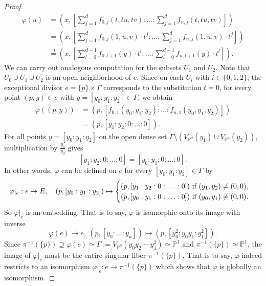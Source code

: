 \documentclass[english,11pt,reqno]{amsart}
\newcommand{\Pone}{\mathbb{P}^1}
\newcommand{\Ptwo}{\mathbb{P}^2}
\newcommand{\Pthree}{\mathbb{P}^3}
\newcommand{\VPtwo}{V_{\Ptwo}}
\newcommand{\VPthree}{V_{\Pthree}}
\begin{document}
\begin{proof}
\begin{align*}
\varphi(u) &= \left(x,\left[\sum_{j=1}^d f_{0,j}(t,tu,tv): {\dots}: \sum_{j=1}^d f_{n,j}(t,tu,tv) \right]\right) \\
&= \left(x,\left[\sum_{j=1}^d f_{0,j}(1,u,v)\cdot t^j: {\dots}: \sum_{j=1}^d f_{n,j}(1,u,v) \cdot t^j \right]\right) \\
&\overset{:t}{=} \left(x,\left[\sum_{l=0}^{d-1} f_{0,l+1}(y)\cdot t^l: {\dots}: \sum_{l=0}^{d-1} f_{n,l+1}(y) \cdot t^l \right]\right).
\end{align*}
We can carry out analogous computation for the subsets $U_1$ and $U_2$. Note that $U_0\cup U_1\cup U_2$ is an open neighborhood of $e$. Since on each $U_i$ with $i\in\{0,1,2\}$, the exceptional divisor $e=\{p\}\times \Gamma$ corresponds to the substitution $t=0$, for every point $(p,y)\in e$ with $y=[y_0:y_1:y_2]\in\Gamma$, we obtain
\begin{align*}
\varphi((p,y)) &= (p,[f_{0,1}(y_0,y_1,y_2):{\dots} :f_{n,1}(y_0,y_1,y_2)]) \\
&= (p,[y_1:y_2:0:{\dots}:0 ]).
\end{align*}
For all points $y=[y_0:y_1:y_2]$ on the open dense set $\Gamma \setminus (\VPtwo(y_1)\cup \VPtwo(y_2))$, multiplication by $\frac{y_1}{y_2}$ gives $$[y_1:y_2:0:{\dots}:0] = [y_0:y_1:0:{\dots}:0].$$
In other words, $\varphi$ can be defined on $e$ for every $[y_0:y_1:y_2]\in \Gamma$ by 
$$ \varphi|_{e}:e\rightarrow E, \quad (p,[y_0:y_1:y_2])\mapsto \begin{cases}
(p,[y_1:y_2:0:{\dots}:0]) \textup{ if } (y_1,y_2)\neq (0,0),\\
(p,[y_0:y_1:0:{\dots}:0])\textup{ if } (y_0,y_1)\neq (0,0).
\end{cases} $$
So $\varphi|_{e}$ is an embedding. That is to say, $\varphi$ is isomorphic onto its image with inverse
$$ \varphi(e)\rightarrow e, \: (p,[y_0:{\dots}:y_n]) \mapsto (p,[y_0^2:y_0y_1:y_1^2]). $$
Since $\pi^{-1}(\{p\}) \supseteq \varphi(e)\simeq \Gamma:=\VPthree(y_0y_2-y_1^2) \simeq \Pone$ and $\pi^{-1}(\{p\}) \simeq \Pone$, the image of $\varphi|_{e}$ must be the entire singular fiber $\pi^{-1}(\{p\})$. That is to say, $\varphi$ indeed restricts to an isomorphism $\varphi|_{e}: e \rightarrow \pi^{-1}(\{p\})$ which shows that $\varphi$ is globally an isomorphism.
\end{proof}
%
%
\end{document}
